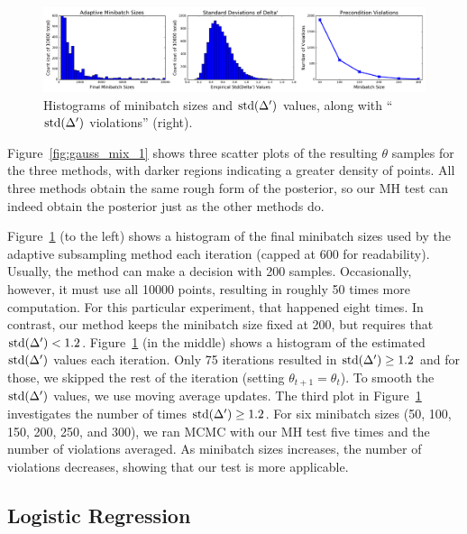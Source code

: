 \documentclass{article}
\begin{document}
\begin{figure}[t]
    \centering
    \includegraphics[width=1\linewidth]{adaptive_and_ours_information_v01.png}
    \caption{
    Histograms of minibatch sizes and ${\rm std}(\Delta')$ values, along with ``${\rm std}(\Delta')$
    violations'' (right).
    }
    \label{fig:gauss_mix_2}
\end{figure}

Figure~\ref{fig:gauss_mix_1} shows three scatter plots of the resulting $\theta$ samples for the
three methods, with darker regions indicating a greater density of points. All three methods obtain
the same rough form of the posterior, so our MH test can indeed obtain the posterior just as the
other methods do.

Figure~\ref{fig:gauss_mix_2} (to the left) shows a histogram of the final minibatch sizes used by
the adaptive subsampling method each iteration (capped at 600 for readability).  Usually, the method
can make a decision with 200 samples. Occasionally, however, it must use all 10000 points, resulting
in roughly 50 times more computation. For this particular experiment, that happened eight times.  In
contrast, our method keeps the minibatch size fixed at 200, but requires that ${\rm std}(\Delta') <
1.2$. Figure~\ref{fig:gauss_mix_2} (in the middle) shows a histogram of the estimated ${\rm
std}(\Delta')$ values each iteration. Only 75 iterations resulted in ${\rm std}(\Delta') \ge 1.2$
and for those, we skipped the rest of the iteration (setting $\theta_{t+1}=\theta_t$). To smooth the
${\rm std}(\Delta')$ values, we use moving average updates. The third plot in
Figure~\ref{fig:gauss_mix_2} investigates the number of times ${\rm std}(\Delta') \ge 1.2$. For six
minibatch sizes (50, 100, 150, 200, 250, and 300), we ran MCMC with our MH test five times and the
number of violations averaged. As minibatch sizes increases, the number of violations decreases,
showing that our test is more applicable.


\subsection{Logistic Regression}\label{ssec:logistic}
\end{document}
